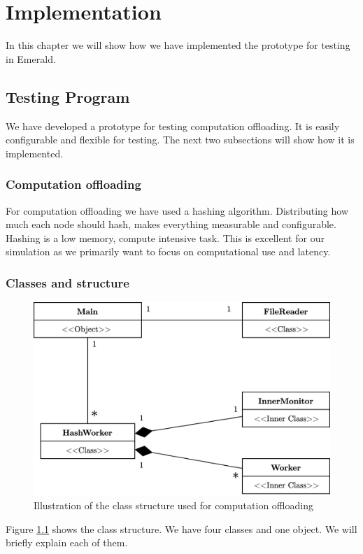 \chapter{Implementation}\label{chapter:implementation}


In this chapter we will show how we have implemented the prototype for testing in Emerald.

\section{Testing Program}
We have developed a prototype for testing computation offloading. It is easily configurable and flexible for testing. The next two subsections will show how it is implemented.



\subsection{Computation offloading}
For computation offloading we have used a hashing algorithm. Distributing how much each node should hash, makes everything measurable and configurable. Hashing is a low memory, compute intensive task. This is excellent for our simulation as we primarily want to focus on computational use and latency.






\subsection{Classes and structure}
\begin{figure}[t]
    \centering
    \includegraphics[scale=0.9]{chapters/5_implementation/figures/HashWorker_class_diagram.png}
    \caption{Illustration of the class structure used for computation offloading}
    \label{fig:HashWorker_class_diagram}
\end{figure}
Figure \ref{fig:HashWorker_class_diagram} shows the class structure. We have four classes and one object. We will briefly explain each of them.



